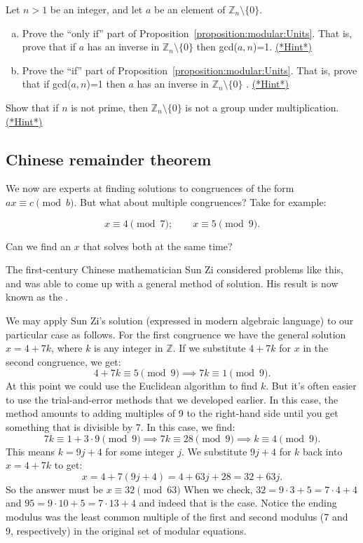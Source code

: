 \begin{exercise}{93}
Let $n>1$ be an integer, and let  $a$ be an element of  $\mathbb{Z}_n \setminus \{0\}$.
\begin{enumerate}[(a)]
\item  Prove  the ``only if'' part  of Proposition~\ref{proposition:modular:Units}. That is, prove that if $a$ has an inverse in $\mathbb{Z}_n \setminus \{0\} $ then gcd($a,n$)=1.
\hyperref[sec:modular_arithmetic:hints]{(*Hint*)}
\item Prove the ``if'' part   of Proposition~\ref{proposition:modular:Units}. That is, prove that if gcd($a,n$)=1 then $a$ has an inverse in $\mathbb{Z}_n \setminus \{0\}$ .
\hyperref[sec:modular_arithmetic:hints]{(*Hint*)}
\end{enumerate}
\end{exercise}

\begin{exercise}{94}
Show that if $n$ is not prime, then $\mathbb{Z}_n\setminus \{0\}$ is not a group under multiplication.
\hyperref[sec:modular_arithmetic:hints]{(*Hint*)}
\end{exercise}

\subsection{Chinese remainder theorem}
We now are experts at finding solutions to congruences  of the form $ax \equiv c \pmod b$. But what about multiple congruences?  Take for example:

\[x \equiv 4 \pmod 7; \qquad x \equiv 5 \pmod 9.\]

Can we find  an $x$ that solves both at the same time? 

The first-century Chinese mathematician Sun Zi considered problems like this, and was able to come up with a general method of solution. His result is now known as the .  

We may apply Sun Zi's solution (expressed in modern algebraic language) to our particular case as follows. For the first congruence we have the general solution $x=4+7k$, where $k$ is any integer in $\mathbb{Z}$.  If we  substitute $4+7k$ for $x$ in the second congruence, we get:
\[4+7k \equiv 5 \pmod 9 \implies 7k \equiv 1 \pmod 9.\]
At this point we could use the Euclidean algorithm to find $k$. But it's often easier to use the trial-and-error methods that we developed earlier. In this case, the method amounts to adding multiples of 9 to the right-hand side until you get something that is divisible by 7.  In this case, we find:
\[7k \equiv 1 + 3\cdot 9 \pmod 9 \implies 7k \equiv 28 \pmod 9 \implies k \equiv 4 \pmod 9.\]
This means $k = 9j + 4$ for some integer $j$.  We substitute $9j + 4$ for $k$ back into $x=4+7k$ to get:
\[x = 4 + 7(9j + 4) = 4 + 63j + 28 = 32 + 63j.\]
So the answer must be $x \equiv 32 \pmod {63}$  When we check, $32 = 9 \cdot 3 + 5 = 7 \cdot 4 + 4$ and $95 = 9 \cdot 10 + 5 = 7 \cdot 13 + 4$ and indeed that is the case.  Notice the ending modulus was the least common multiple of the first and second modulus (7 and  9, respectively) in the original set of modular equations.


